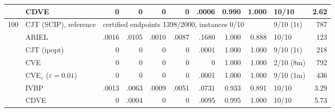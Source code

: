 \begin{table}[htbp]
\begin{tabular}{rlrrrrrrrlr}
 & CDVE & 0 & 0 & 0 & 0 & .0006 & 0.990 & 1.000 & 10/10 & 2.62 \\
\midrule
100 & CJT (SCIP), reference & \multicolumn{7}{l}{certified endpoints 1398/2000, instances 0/10} & 9/10 (1t) & 787 \\
 & ARIEL & .0016 & .0105 & .0010 & .0087 & .1680 & 1.000 & 0.888 & 10/10 & 123 \\
 & CJT (ipopt) & 0 & 0 & 0 & 0 & .0001 & 1.000 & 1.000 & 9/10 (1t) & 218 \\
 & CVE & 0 & 0 & 0 & 0 & 0 & 1.000 & 1.000 & 2/10 (8m) & 792 \\
 & CVE$_\varepsilon$ ($\varepsilon{=}0.01$) & 0 & 0 & 0 & 0 & .0001 & 1.000 & 1.000 & 9/10 (1m) & 436 \\
 & IVBP & .0013 & .0063 & .0009 & .0051 & .0731 & 0.933 & 0.891 & 10/10 & 3.29 \\
 & CDVE & 0 & .0004 & 0 & 0 & .0095 & 0.995 & 1.000 & 10/10 & 5.73 \\
\bottomrule
\end{tabular}
\end{table}
